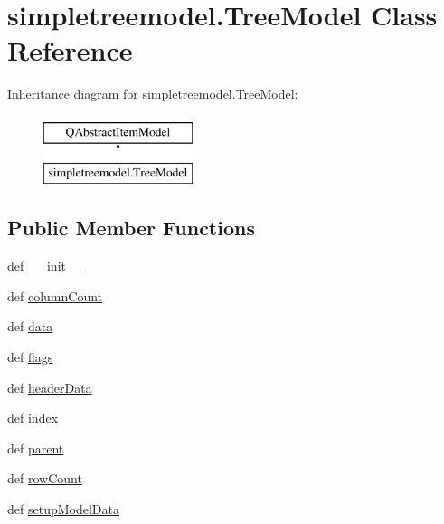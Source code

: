 \hypertarget{classsimpletreemodel_1_1TreeModel}{}\section{simpletreemodel.\+Tree\+Model Class Reference}
\label{classsimpletreemodel_1_1TreeModel}
Inheritance diagram for simpletreemodel.\+Tree\+Model\+:\begin{figure}[H]
\begin{center}
\leavevmode
\includegraphics[height=2.000000cm]{classsimpletreemodel_1_1TreeModel}
\end{center}
\end{figure}
\subsection*{Public Member Functions}
\begin{DoxyCompactItemize}
\item 
def \hyperlink{classsimpletreemodel_1_1TreeModel_a649777e16c6b98760c5112350c99d46b}{\+\_\+\+\_\+init\+\_\+\+\_\+}
\item 
def \hyperlink{classsimpletreemodel_1_1TreeModel_a173a0393a1c66797c898d3e0acd2d67b}{column\+Count}
\item 
def \hyperlink{classsimpletreemodel_1_1TreeModel_ad108f9d72baa495bba04ca8d7090a9fe}{data}
\item 
def \hyperlink{classsimpletreemodel_1_1TreeModel_afc8b413f7a1f3a910a89e5efe9ab21d9}{flags}
\item 
def \hyperlink{classsimpletreemodel_1_1TreeModel_a2c1390308ec5458958c815e534360617}{header\+Data}
\item 
def \hyperlink{classsimpletreemodel_1_1TreeModel_a4e2cdafccf719d59ebc0d176b7393c2a}{index}
\item 
def \hyperlink{classsimpletreemodel_1_1TreeModel_a1ebb60c8b8b73a4cdac9e614b1abfd19}{parent}
\item 
def \hyperlink{classsimpletreemodel_1_1TreeModel_a256c68f4514cc634f28eea348f0e2034}{row\+Count}
\item 
def \hyperlink{classsimpletreemodel_1_1TreeModel_af3e7c62a7378e49ee99f46f5f8f1096c}{setup\+Model\+Data}
\end{DoxyCompactItemize}
